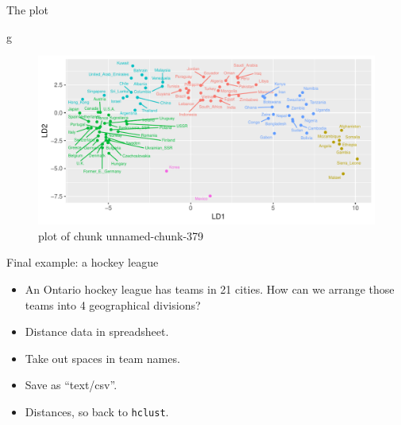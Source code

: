 \documentclass[ignorenonframetext,]{beamer}
\newenvironment{Shaded}{\begin{snugshade}}{\end{snugshade}}
\newcommand{\NormalTok}[1]{#1}
\begin{document}
\begin{frame}[fragile]{The plot}
\protect\hypertarget{the-plot-8}{}

\begin{Shaded}
\begin{Highlighting}[]
\NormalTok{g}
\end{Highlighting}
\end{Shaded}

\begin{figure}
\centering
\includegraphics{figure/unnamed-chunk-379-1.pdf}
\caption{plot of chunk unnamed-chunk-379}
\end{figure}

\end{frame}

\begin{frame}[fragile]{Final example: a hockey league}
\protect\hypertarget{final-example-a-hockey-league}{}

\begin{itemize}
\item
  An Ontario hockey league has teams in 21 cities. How can we arrange
  those teams into 4 geographical divisions?
\item
  Distance data in spreadsheet.
\item
  Take out spaces in team names.
\item
  Save as ``text/csv''.
\item
  Distances, so back to \texttt{hclust}.
\end{itemize}

\end{frame}
\end{document}
